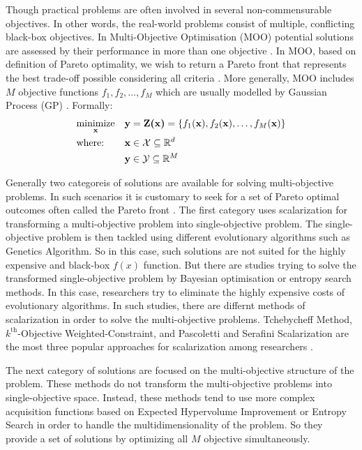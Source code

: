 Though practical problems are often involved in several non-commensurable objectives. In other words, the real-world problems consist of multiple, conflicting black-box objectives. In Multi-Objective Optimisation (MOO) potential solutions are assessed  by their performance in more than one objective \cite{couckuyt2014fast}. In MOO, based on definition of Pareto optimality, we wish to return a Pareto front that represents the best trade-off  possible considering all criteria \cite{calandra2014pareto}.  More generally, MOO includes $M$ objective functions $f_1, f_2, \ldots, f_M$ which are usually modelled by Gaussian Process (GP) \cite{rasmussen2006gaussian}. Formally:
\begin{equation*}
\begin{aligned}
& \underset{\textbf{x}}{\text{minimize}}
& & \textbf{y}=\textbf{Z(x)}=\{f_1(\textbf{x}),f_2(\textbf{x}), \ldots,f_M(\textbf{x})\} \\
& \text{where:}
& & {\textbf x} \in \mathcal{X} \subseteq \mathbb{R}^d\\
& \text{}
& & {\textbf y} \in \mathcal{Y} \subseteq \mathbb{R}^M\\
\end{aligned}
\end{equation*}
\par
Generally two categoreis of solutions are available for solving multi-objective problems. In such scenarios it is customary to seek for a set of Pareto optimal outcomes often called the Pareto front \cite{couckuyt2014fast}. The first category uses scalarization for transforming a multi-objective problem into single-objective problem. The single-objective problem is then tackled using different evolutionary algorithms such as Genetics Algorithm. So in this case, such solutions are not suited for the highly expensive and black-box $f(x)$ function. But there are studies trying to solve the transformed single-objective problem by Bayesian optimisation or entropy search methods. In this case, researchers try to eliminate the highly expensive costs of evolutionary algorithms. In such studies, there are differnt methods of scalarization in order to solve the multi-objective problems. Tchebycheff Method, $k^{\text{th}}$-Objective Weighted-Constraint, and  Pascoletti and Serafini Scalarization are the most three popular approaches for scalarization among researchers \cite{pardalos2017non}.
\par
The next category of solutions are focused on the multi-objective structure of the problem. These methods do not transform the multi-objective problems into single-objective space. Instead, these methods tend to use more complex acquisition functions based on Expected Hypervolume Improvement or Entropy Search in order to handle the multidimensionality of the problem. So they provide a set of solutions by optimizing all $M$ objective simultaneously.  

